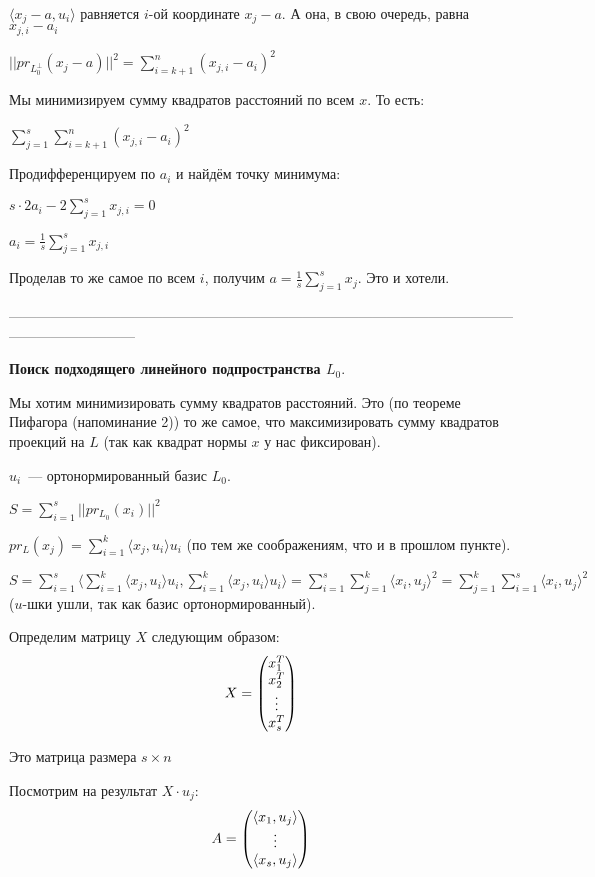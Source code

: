 $\langle x_j - a, u_i\rangle$ равняется $i$-ой координате $x_j - a$. А она, в свою очередь, равна $x_{j, i} - a_i$

$||pr_{L_0^{\perp}}(x_j-a)||^2 = \sum\limits_{i = k + 1}^n (x_{j, i} - a_i)^2$

Мы минимизируем сумму квадратов расстояний по всем $x$. То есть:

$\sum\limits_{j = 1}^s \sum\limits_{i = k + 1}^n (x_{j, i} - a_i)^2$

Продифференцируем по $a_i$ и найдём точку минимума:

$s\cdot 2a_i -2\sum\limits_{j=1}^s x_{j, i} = 0$

$a_i = \frac{1}{s} \sum\limits_{j=1}^s x_{j, i}$

Проделав то же самое по всем $i$, получим $a = \frac{1}{s} \sum\limits_{j=1}^s x_j$. Это и хотели.

\ethrm

---------------------------------------------------------------------------------------------------------------------------------------

{\bf Поиск подходящего линейного подпространства $L_0$}.

Мы хотим минимизировать сумму квадратов расстояний. Это (по теореме Пифагора (напоминание 2)) то же самое, что максимизировать сумму квадратов проекций на $L$ (так как квадрат нормы $x$ у нас фиксирован).

$u_i$~--- ортонормированный базис $L_0$.

$S = \sum\limits_{i = 1}^s ||pr_{L_0}(x_i)||^2$

$pr_L(x_j) = \sum\limits_{i = 1}^k \langle x_j, u_i\rangle u_i$ (по тем же соображениям, что и в прошлом пункте).

$S = \sum\limits_{i = 1}^s\langle\sum\limits_{i = 1}^k \langle x_j, u_i\rangle u_i, \sum\limits_{i = 1}^k \langle x_j, u_i\rangle u_i\rangle = \sum\limits_{i = 1}^s\sum\limits_{j = 1}^k \langle x_i, u_j\rangle^2 = \sum\limits_{j = 1}^k\sum\limits_{i = 1}^s \langle x_i, u_j\rangle^2$ ($u$-шки ушли, так как базис ортонормированный).

Определим матрицу $X$ следующим образом:
$$
X = \begin{pmatrix}
x_1^T\\
x_2^T\\
\vdots\\
x_s^T
\end{pmatrix}
$$

Это матрица размера $s\times n$

Посмотрим на результат $X\cdot u_j$:
$$
A=\begin{pmatrix}
\langle x_1, u_j\rangle\\
\vdots\\
\langle x_s, u_j\rangle
\end{pmatrix} 
$$

